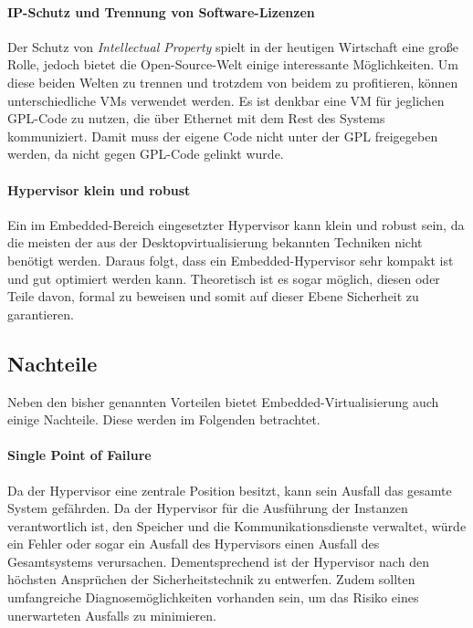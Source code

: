 \documentclass[
  a4paper,					    %
  twoside,
  DIV=calc,     				%
  bibliography=totoc,
  cleardoublepage=empty,
  ngerman,     					%
  final       					%
]{scrbook}
\begin{document}
\paragraph{IP-Schutz und Trennung von Software-Lizenzen}
Der Schutz von \emph{Intellectual Property} spielt in der heutigen Wirtschaft eine große Rolle, jedoch bietet die Open-Source-Welt einige interessante Möglichkeiten. Um diese beiden Welten zu trennen und trotzdem von beidem zu profitieren, können unterschiedliche VMs verwendet werden. Es ist denkbar eine VM für jeglichen GPL-Code zu nutzen, die über Ethernet mit dem Rest des Systems kommuniziert. Damit muss der eigene Code nicht unter der GPL freigegeben werden, da nicht gegen GPL-Code gelinkt wurde.

\paragraph{Hypervisor klein und robust}
Ein im Embedded-Bereich eingesetzter Hypervisor kann klein und robust sein, da die meisten der aus der Desktopvirtualisierung bekannten Techniken nicht benötigt werden. Daraus folgt, dass ein Embedded-Hypervisor sehr kompakt ist und gut optimiert werden kann. Theoretisch ist es sogar möglich, diesen oder Teile davon, formal zu beweisen und somit auf dieser Ebene Sicherheit zu garantieren.

\subsection{Nachteile}
Neben den bisher genannten Vorteilen bietet Embedded-Virtualisierung auch einige Nachteile. Diese werden im Folgenden betrachtet.

\paragraph{Single Point of Failure}
Da der Hypervisor eine zentrale Position besitzt, kann sein Ausfall das gesamte System gefährden. Da der Hypervisor für die Ausführung der Instanzen verantwortlich ist, den Speicher und die Kommunikationsdienste verwaltet, würde ein Fehler oder sogar ein Ausfall des Hypervisors einen Ausfall des Gesamtsystems verursachen. Dementsprechend ist der Hypervisor nach den höchsten Ansprüchen der Sicherheitstechnik zu entwerfen. Zudem sollten umfangreiche Diagnosemöglichkeiten vorhanden sein, um das Risiko eines unerwarteten Ausfalls zu minimieren.
\end{document}
